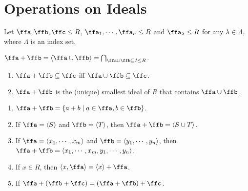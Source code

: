 \section{Operations on Ideals}

Let $\ffa,\ffb,\ffc \leq R$, $\ffa_1,\cdots,\ffa_n \leq R$ and $\ffa_\lambda \leq R$ for any $\lambda \in \Lambda$, where $\Lambda$ is an index set.

\begin{definition}
    $\ffa + \ffb = \langle \ffa \cup \ffb \rangle = \bigcap_{\ffa \cup \ffb \subseteq I \leq R}$.
\end{definition}

\begin{remark}[Fact]
    \begin{enumerate}[(1)]
        \item $\ffa + \ffb \subseteq \ffc$ iff $\ffa \cup \ffb \subseteq \ffc$.
        \item $\ffa + \ffb$ is the (unique) smallest ideal of $R$ that contains $\ffa \cup \ffb$.
    \end{enumerate}
\end{remark}

\begin{proposition}
    \begin{enumerate}[(1)]
        \item $\ffa + \ffb = \{a + b \mid a \in \ffa, b \in \ffb\}$.
        \item If $\ffa = \langle S \rangle$ and $\ffb = \langle T \rangle$, then $\ffa + \ffb = \langle S \cup T \rangle$.
        \item If $\ffa = \langle x_1,\cdots,x_m \rangle$ and $\ffb = \langle y_1,\cdots,y_n \rangle$, then $\ffa + \ffb = \langle x_1,\cdots,x_m, y_1,\cdots,y_n \rangle$.
        \item If $x \in R$, then $\langle x,\ffa \rangle = \langle x \rangle + \ffa$.
        \item If $\ffa + (\ffb + \ffc) = (\ffa + \ffb) + \ffc$.
    \end{enumerate}
\end{proposition}

